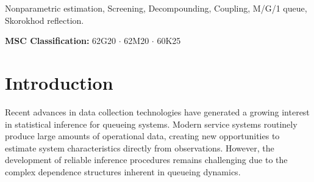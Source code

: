 \documentclass[12pt]{article}
\newcommand{\1}{\mathbf{1}}
\begin{document}
\begin{abstract} Hansen and Pitts (2006) introduced the problem of nonparametric estimation of the service-time distribution of an M/G/1 queue observed through its workload process at discrete times $t=0,1,\ldots,n$. Despite its seemingly simple formulation, obtaining an estimator with sharp risk guarantees for this observation model has remained an open challenge for nearly two decades. 

In this paper, we construct such an estimator and prove that its $L^1$-risk is $\mathcal{O}\left(\frac{\log n}{\sqrt{n}}\right)$ as $n\to\infty$. Remarkably, this nearly parametric convergence rate is achieved without assuming stationarity, stability, or knowledge of the arrival rate. 

Our approach is based on a two-stage screening procedure that uncovers a hidden conditionally independent compound Poisson structure within the dependent workload observations. This probabilistic reduction transforms the original estimation problem into a classical decompounding problem, making it possible to leverage existing nonparametric estimation techniques despite the complex dependence induced by the reflected workload process. 

More broadly, we hope that the proposed screening methodology will provide a useful framework for statistical inference from dependent stochastic systems beyond the classical assumption of stability.\end{abstract}

Nonparametric estimation, Screening, Decompounding, Coupling, M/G/1 queue, Skorokhod reflection.
\smallskip

\noindent\textbf{MSC Classification:} 62G20 $\cdot$  62M20 $\cdot$ 60K25 

\section{Introduction} 
Recent advances in data collection technologies have generated a growing interest in statistical inference for queueing systems. Modern service systems routinely produce large amounts of operational data, creating new opportunities to estimate system characteristics directly from observations. However, the development of reliable inference procedures remains challenging due to the complex dependence structures inherent in queueing dynamics.
\end{document}
